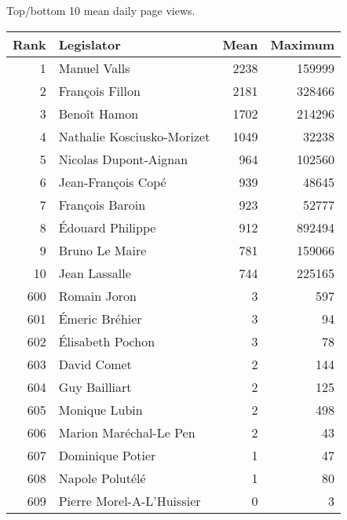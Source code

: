 \centering
\caption{Top/bottom 10 mean daily page views.\label{tab:pageviewstopfra}} 
\begingroup\scriptsize
\begin{tabular}{rlrr}
  \toprule
Rank & Legislator & Mean & Maximum \\ 
  \midrule
1 & Manuel Valls & 2238 & 159999 \\ 
  2 & François Fillon & 2181 & 328466 \\ 
  3 & Benoît Hamon & 1702 & 214296 \\ 
  4 & Nathalie Kosciusko-Morizet & 1049 & 32238 \\ 
  5 & Nicolas Dupont-Aignan & 964 & 102560 \\ 
   \midrule
6 & Jean-François Copé & 939 & 48645 \\ 
  7 & François Baroin & 923 & 52777 \\ 
  8 & Édouard Philippe & 912 & 892494 \\ 
  9 & Bruno Le Maire & 781 & 159066 \\ 
  10 & Jean Lassalle & 744 & 225165 \\ 
   \midrule
600 & Romain Joron & 3 & 597 \\ 
  601 & Émeric Bréhier & 3 & 94 \\ 
  602 & Élisabeth Pochon & 3 & 78 \\ 
  603 & David Comet & 2 & 144 \\ 
  604 & Guy Bailliart & 2 & 125 \\ 
   \midrule
605 & Monique Lubin & 2 & 498 \\ 
  606 & Marion Maréchal-Le Pen & 2 & 43 \\ 
  607 & Dominique Potier & 1 & 47 \\ 
  608 & Napole Polutélé & 1 & 80 \\ 
  609 & Pierre Morel-A-L'Huissier & 0 & 3 \\ 
   \bottomrule
\end{tabular}
\endgroup
